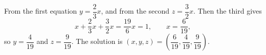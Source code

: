 From the first equation $y=\dfrac23x$, and from the second $z=\dfrac32x$. Then the third gives
\[x+\dfrac23x+\dfrac32x=\dfrac{19}{6}x=1,\qquad x=\dfrac{6}{19},\]
so $y=\dfrac{4}{19}$ and $z=\dfrac{9}{19}$. The solution is $\boxed{(x,y,z)=\left(\dfrac{6}{19},\dfrac{4}{19},\dfrac{9}{19}\right)}$.
